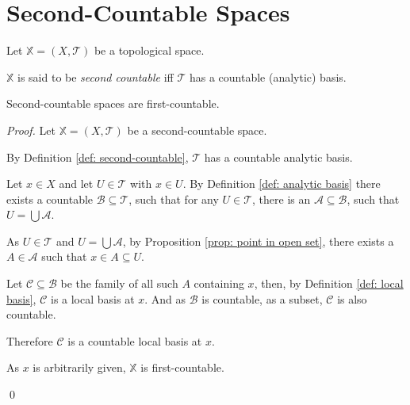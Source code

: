 \section{Second-Countable Spaces}


\begin{definition}
	\label{def: second-countable}
	Let $\mathbb X = (X, \mathcal T)$ be a topological space.
	
	$\mathbb X$ is said to be \textit{second countable} iff $\mathcal T$ has a countable (analytic) basis.
\end{definition}


\begin{proposition}
	Second-countable spaces are first-countable.
	
	\begin{proof}
		Let $\mathbb X = (X, \mathcal T)$ be a second-countable space.
	
		By Definition \ref{def: second-countable}, $\mathcal T$ has a countable analytic basis.
		
		Let $x \in X$ and let $U \in \mathcal T$ with $x \in U$. By Definition \ref{def: analytic basis} there exists a countable $\mathcal B \subseteq \mathcal T$, such that for any $U \in \mathcal T$, there is an $\mathcal A \subseteq \mathcal B$, such that $U = \bigcup \mathcal A$. 
		
		As $U \in \mathcal T$ and $U = \bigcup \mathcal A$, by Proposition \ref{prop: point in open set}, there exists a $A \in \mathcal A$ such that $x \in A \subseteq U$.
		
		Let $\mathcal C \subseteq \mathcal B$ be the family of all such $A$ containing $x$, then, by Definition \ref{def: local basis}, $\mathcal C$ is a local basis at $x$. And as $\mathcal B$ is countable, as a subset, $\mathcal C$ is also countable.
		
		Therefore $\mathcal C$ is a countable local basis at $x$.
		
		As $x$ is arbitrarily given, $\mathbb X$ is first-countable.
		
		\qed
	\end{proof}
\end{proposition}

